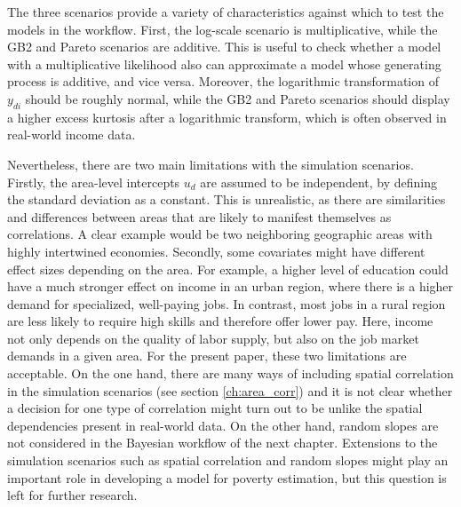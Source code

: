 The three scenarios provide a variety of characteristics against which to test the models in the workflow.
First, the log-scale scenario is multiplicative, while the GB2 and Pareto scenarios are additive.
This is useful to check whether a model with a multiplicative likelihood also can approximate a model whose generating process is additive, and vice versa.
Moreover, the logarithmic transformation of $y_{di}$ should be roughly normal, while the GB2 and Pareto scenarios should display a higher excess kurtosis after a logarithmic transform, which is often observed in real-world income data.

Nevertheless, there are two main limitations with the simulation scenarios.
Firstly, the area-level intercepts $u_d$ are assumed to be independent, by defining the standard deviation as a constant.
This is unrealistic, as there are similarities and differences between areas that are likely to manifest themselves as correlations.
A clear example would be two neighboring geographic areas with highly intertwined economies.
Secondly, some covariates might have different effect sizes depending on the area.
For example, a higher level of education could have a much stronger effect on income in an urban region, where there is a higher demand for specialized, well-paying jobs.
In contrast, most jobs in a rural region are less likely to require high skills and therefore offer lower pay.
Here, income not only depends on the quality of labor supply, but also on the job market demands in a given area.
For the present paper, these two limitations are acceptable.
On the one hand, there are many ways of including spatial correlation in the simulation scenarios (see section \ref{ch:area_corr}) and it is not clear whether a decision for one type of correlation might turn out to be unlike the spatial dependencies present in real-world data.
On the other hand, random slopes are not considered in the Bayesian workflow of the next chapter.
Extensions to the simulation scenarios such as spatial correlation and random slopes might play an important role in developing a model for poverty estimation, but this question is left for further research.